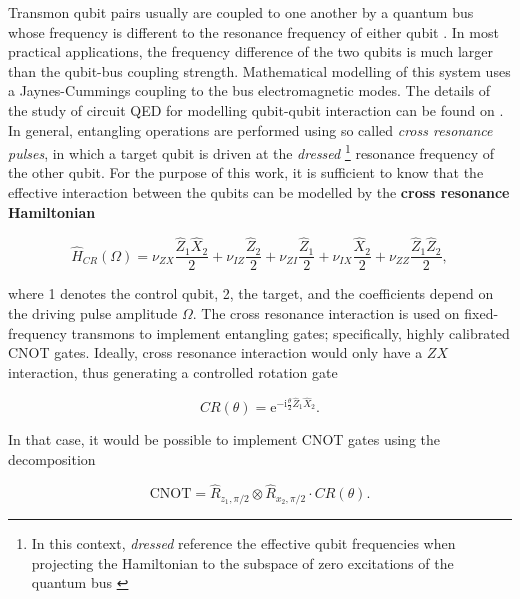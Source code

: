     Transmon qubit pairs usually are coupled to one another by a quantum bus whose frequency is different to the resonance frequency of either qubit \cite{quantumEngineer, 2016RZXCalibration}. In most practical applications, the frequency difference of the two qubits is much larger than the qubit-bus coupling strength. Mathematical modelling of this system uses a Jaynes-Cummings coupling to the bus electromagnetic modes. The details of the study of circuit QED for modelling qubit-qubit interaction can be found on \cite{2020RZXHamiltonianModels}. In general, entangling operations are performed using so called \textit{cross resonance pulses}, in which a target qubit is driven at the \textit{dressed} \footnote{In this context, \textit{dressed} reference the effective qubit frequencies when projecting the Hamiltonian to the subspace of zero excitations of the quantum bus \cite{2020RZXHamiltonianModels}} resonance frequency of the other qubit. For the purpose of this work, it is sufficient to know that the effective interaction between the qubits can be modelled by the \textbf{cross resonance Hamiltonian} \cite{DuplicatedRXZPulse, 2016RZXCalibration}

    \begin{equation}
      \hat{H}_{CR}(\Omega) = \nu_{ZX} \frac{\hat{Z}_1\hat{X}_2}{2} + \nu_{IZ} \frac{\hat{Z}_2}{2} + \nu_{ZI} \frac{\hat{Z}_1}{2} + \nu_{IX} \frac{\hat{X}_2}{2} + \nu_{ZZ} \frac{\hat{Z}_1\hat{Z}_2}{2},
      \label{eq:CRHamiltonian}
    \end{equation}

    \noindent where 1 denotes the control qubit, 2, the target, and the coefficients depend on the driving pulse amplitude $\Omega$. The cross resonance interaction is used on fixed-frequency transmons to implement entangling gates; specifically, highly calibrated CNOT gates. Ideally, cross resonance interaction would only have a $ZX$ interaction, thus generating a controlled rotation gate

    \begin{equation}
      CR(\theta) = \mathrm{e}^{-\mathrm{i}\frac{\theta}{2}\hat{Z}_1\hat{X}_2}.
    \end{equation}

    \noindent In that case, it would be possible to implement CNOT gates using the decomposition \cite{quantumEngineer}

    \begin{equation}
      \text{CNOT} = \hat{R}_{z_1, \pi/2} \otimes \hat{R}_{x_2, \pi/2} \cdot CR(\theta).
    \end{equation}

